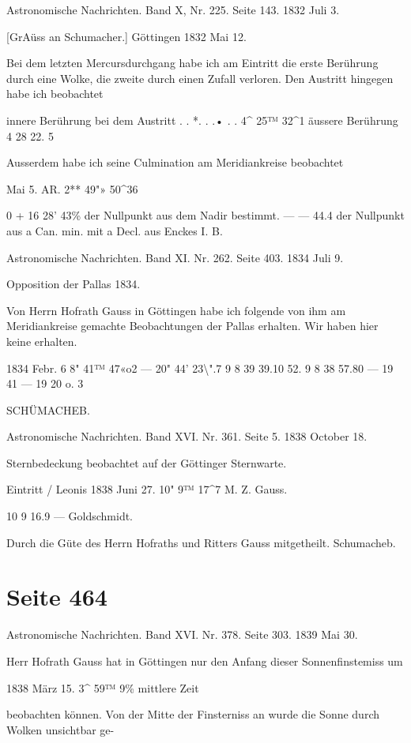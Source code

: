 \documentclass[10pt,a4paper]{article}
\begin{document}
Astronomische Nachrichten. Band X, Nr. 225. Seite 143. 1832 Juli 3.

[GrAüss an Schumacher.] Göttingen 1832 Mai 12.

Bei dem letzten Mercursdurchgang habe ich am Eintritt die erste Berührung durch eine Wolke, die zweite durch einen Zufall verloren. Den Austritt hingegen habe ich beobachtet

innere Berührung bei dem Austritt . . *. . .• . . 4\textasciicircum{} 25™ 32\textasciicircum{}1 äussere Berührung 4 28 22. 5

Ausserdem habe ich seine Culmination am Meridiankreise beobachtet

Mai 5. AR. 2** 49"» 50\textasciicircum{}36

0 + 16\textdegree{} 28' 43\% der Nullpunkt aus dem Nadir bestimmt. — — 44.4 der Nullpunkt aus a Can. min. mit a Decl. aus Enckes I. B.

Astronomische Nachrichten. Band XI. Nr. 262. Seite 403. 1834 Juli 9.

Opposition der Pallas 1834.

Von Herrn Hofrath Gauss in Göttingen habe ich folgende von ihm am Meridiankreise gemachte Beobachtungen der Pallas erhalten. Wir haben hier keine erhalten.

1834 Febr. 6 8" 41™ 47«o2 — 20" 44' 23\textbackslash{}".7 9 8 39 39.10 52. 9 8 38 57.80 — 19 41 — 19 20 o. 3

SCHÜMACHEB.

Astronomische Nachrichten. Band XVI. Nr. 361. Seite 5. 1838 October 18.

Sternbedeckung beobachtet auf der Göttinger Sternwarte.

Eintritt / Leonis 1838 Juni 27. 10" 9™ 17\textasciicircum{}7 M. Z. Gauss.

10 9 16.9 — Goldschmidt.

Durch die Güte des Herrn Hofraths und Ritters Gauss mitgetheilt. Schumacheb.


\newpage
\section*{Seite 464}
Astronomische Nachrichten. Band XVI. Nr. 378. Seite 303. 1839 Mai 30.

Herr Hofrath Gauss hat in Göttingen nur den Anfang dieser Sonnenfinstemiss um

1838 März 15. 3\textasciicircum{} 59™ 9\% mittlere Zeit

beobachten können. Von der Mitte der Finsterniss an wurde die Sonne durch Wolken unsichtbar ge-
\end{document}
